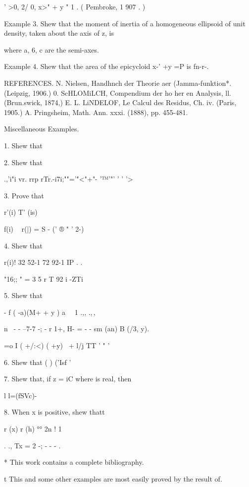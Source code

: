 ' >0, 2/ 0, x>" + y " 1 . ( Pembroke, 1 907 . )

Example 3. Shew that the moment of inertia of a homogeneous ellipsoid
of unit density, taken about the axis of z, is

where a, 6, c are the semi-axes.

Example 4. Shew that the area of the epicycloid x-' +y =P is fn-r-.

REFERENCES. N. Nielsen, Handhnch der Theorie aer (Jamma-funktion*.
(Leipzig, 1906.) 0. ScHLOMiLCH, Compendium der ho her en Analysis, ll.
(Brun.swick, 1874,) E. L. LiNDELOF, Le Calcul des Residus, Ch. iv.
(Paris, 1905.) A. Pringsheim, Math. Ann. xxxi. (1888), pp. 455-481.

Miscellaneous Examples.

1. Shew that


2. Shew that

.,'i"i vr. rrp rTr.-i7i;""='"<"+"- '™'"' ' ' '>

3. Prove that

r'(i) T' (is)

f(i) ~ r(|) = S - (' ® " ' 2-)

4. Shew that

 r(i)! 32 52-1 72 92-1 IP . .

"16;; " = 3  5  r T  92  i -ZTi  

5. Shew that

- f ( -a)(M+ + y ) a \ \ 1 .,, .,\,,

n \ - - --7-7 -; - r 1+, H- = - - sm (an) B (/3, y).

 =o I ( +/:<) ( +y) \ + l/j TT ' " '


6. Shew that ( ) ('Isf ' 

7. Shew that, if z = iC where is real, then

l l=\/(fSVc)- 

8. When x is positive, shew thatt

r (x) r (h) °° 2n ! 1

 . ., Tx = 2 -; - - - . 

* This work contains a complete bibliography.

t This and some other examples are most easily proved by the result of.

